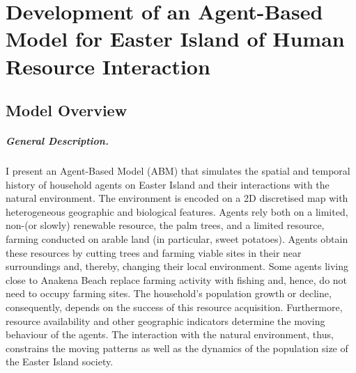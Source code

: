 \chapter{Development of an Agent-Based Model for Easter Island of Human Resource Interaction}\label{chapter:Methods}
\FloatBarrier
\section{Model Overview}
\paragraph{General Description.}
I present an Agent-Based Model (ABM) that simulates the spatial and temporal history of household agents on Easter Island and their interactions with the natural environment. 
The environment is encoded on a 2D discretised map with heterogeneous geographic and biological features.
Agents rely both on a limited, non-(or slowly) renewable resource, the palm trees, and a limited resource, farming conducted on arable land (in particular, sweet potatoes).
Agents obtain these resources by cutting trees and farming viable sites in their near surroundings and, thereby, changing their local environment.
Some agents living close to Anakena Beach replace farming activity with fishing and, hence, do not need to occupy farming sites.
The household's population growth or decline, consequently, depends on the success of this resource acquisition. 
Furthermore, resource availability and other geographic indicators determine the moving behaviour of the agents.
The interaction with the natural environment, thus, constrains the moving patterns as well as the dynamics of the population size of the Easter Island society.

